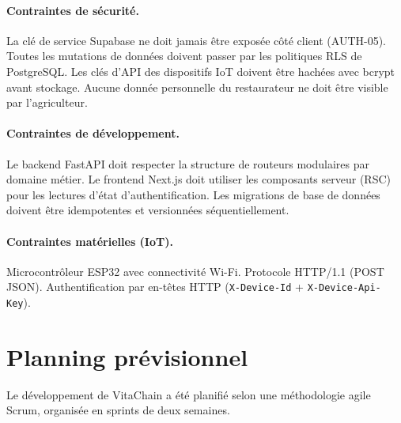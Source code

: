 \documentclass[12pt,a4paper]{report}
\newcommand{\code}[1]{\texttt{\small #1}}
\begin{document}
\paragraph{Contraintes de sécurité.}
La clé de service Supabase ne doit jamais être exposée côté client (AUTH-05). Toutes
les mutations de données doivent passer par les politiques RLS de PostgreSQL. Les clés
d'API des dispositifs IoT doivent être hachées avec bcrypt avant stockage. Aucune donnée
personnelle du restaurateur ne doit être visible par l'agriculteur.

\paragraph{Contraintes de développement.}
Le backend FastAPI doit respecter la structure de routeurs modulaires par domaine métier.
Le frontend Next.js doit utiliser les composants serveur (RSC) pour les lectures d'état
d'authentification. Les migrations de base de données doivent être idempotentes et
versionnées séquentiellement.

\paragraph{Contraintes matérielles (IoT).}
Microcontrôleur ESP32 avec connectivité Wi-Fi. Protocole HTTP/1.1 (POST JSON).
Authentification par en-têtes HTTP (\code{X-Device-Id} + \code{X-Device-Api-Key}).

\section{Planning prévisionnel}

Le développement de VitaChain a été planifié selon une méthodologie agile Scrum,
organisée en sprints de deux semaines.
\end{document}
